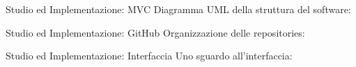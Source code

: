 \documentclass{beamer}
\begin{document}
	
	\begin{frame}{Studio ed Implementazione: MVC}
		Diagramma UML della struttura del software:
		\begin{center}
		\end{center}
	\end{frame}
	
	\begin{frame}{Studio ed Implementazione: GitHub}
		\vspace{-0.2cm}
		Organizzazione delle repositories:
		\begin{center}
		\end{center}
	\end{frame}
	
	\begin{frame}{Studio ed Implementazione: Interfaccia}
		\vspace{-0.2cm}
		Uno sguardo all'interfaccia:
		\begin{center}
		\end{center}
	\end{frame}
	
\end{document}
